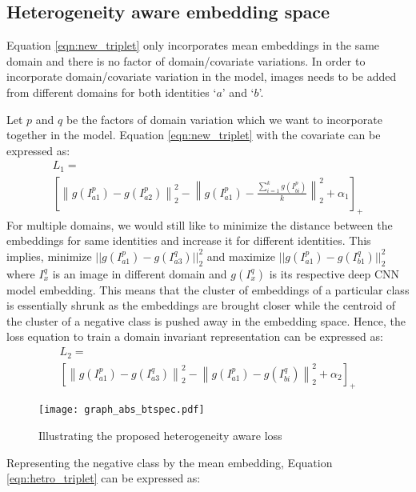 \documentclass[10pt,twocolumn,letterpaper]{article}
\begin{document}
\subsection{Heterogeneity aware embedding space}
Equation \ref{eqn:new_triplet} only incorporates mean embeddings in the same domain and there is no factor of domain/covariate variations. In order to incorporate domain/covariate variation in the model, images needs to be added from different domains for both identities `$a$' and `$b$'. 

Let $p$ and $q$ be the factors of domain variation which we want to incorporate together in the model. Equation \ref{eqn:new_triplet} with the covariate can be expressed as:
\vspace{-15pt}
\begin{multline}
  \label{eqn:cov_new_triplet}
	L_{1} = \\
    \left [\left \| g(I_{a1}^p) - g(I_{a2}^p) \right \|^2_2 - \left \| g(I_{a1}^p) - \frac{\sum_{i=1}^kg(I_{bi}^p)}{k} \right \|^2_2   + \alpha_1 \right]_+
\end{multline}
For multiple domains, we would still like to minimize the distance between the embeddings for same identities and increase it for different identities. This implies, minimize $|| g(I_{a1}^p) - g(I_{a3}^q) ||_2^2$ and maximize $|| g(I_{a1}^p) - g(I_{b1}^q) ||_2^2 $ where $I_x^q$ is an image in different domain and $g(I_x^q)$ is its respective deep CNN model embedding. This means that the cluster of embeddings of a particular class is essentially shrunk as the embeddings are brought closer while the centroid of the cluster of a negative class is pushed away in the embedding space. Hence, the loss equation to train a domain invariant representation can be expressed as:
\begin{multline}
  \label{eqn:hetro_triplet}
	L_{2} = \\
    \left [\left \| g(I_{a1}^p) - g(I_{a3}^q) \right \|^2_2 - \left \| g(I_{a1}^p) - g(I_{bi}^q) \right \|^2_2   + \alpha_2 \right]_+
\end{multline}
\begin{figure}[t!]
  \centering
  \texttt{[image: graph\_abs\_btspec.pdf]}
    \vspace{-8pt}
  \caption{Illustrating the proposed heterogeneity aware loss}
    \vspace{-8pt}
  \label{fig:hetero_loss}
\end{figure}
Representing the negative class by the mean embedding, Equation \ref{eqn:hetro_triplet} can be expressed as:
\end{document}
